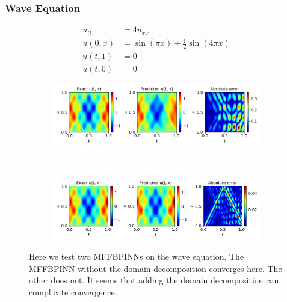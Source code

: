\documentclass[12pt]{article}
\begin{document}
\subsubsection{Wave Equation}
\begin{align*}
u_{tt} &= 4 u_{xx} \\
u(0,x) &= \sin{(\pi x)} + \frac{1}{2} \sin{(4 \pi x)} \\
u(t,1) &= 0\\ 
u(t,0) &= 0
\end{align*}
\begin{figure}[H]
    \centering
    \begin{subfigure}{0.65\textwidth}
        \includegraphics[width=\linewidth]{imgs/wave_dd}
        \caption{}
        \label{subfig:a}
    \end{subfigure}
    \\ %
    \begin{subfigure}{0.65\textwidth}
        \includegraphics[width=\linewidth]{imgs/wave}
        \caption{}
        \label{subfig:b}
    \end{subfigure}
	\caption{Here we test two MFFBPINNs on the wave equation. The MFFBPINN without the domain decomposition converges here. The other does not. It seems that adding the domain decomposition can complicate convergence.}
	\label{fig:wave_res}
\end{figure}
\end{document}
